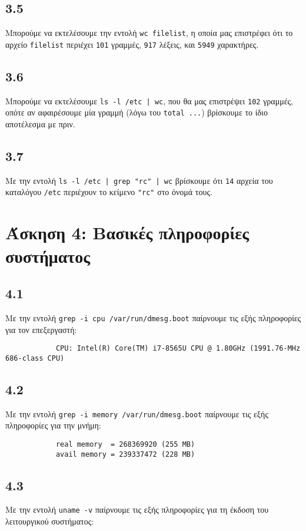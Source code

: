 \documentclass[a4paper, 12pt]{article}
\begin{document}
	\subsection*{3.5}
		Μπορούμε να εκτελέσουμε την εντολή \verb|wc filelist|, η οποία μας επιστρέφει ότι το αρχείο \verb|filelist| περιέχει \verb|101| γραμμές, \verb|917| λέξεις, και \verb|5949| χαρακτήρες.

	\subsection*{3.6}
		Μπορούμε να εκτελέσουμε \verb+ls -l /etc | wc+, που θα μας επιστρέψει \verb|102| γραμμές, οπότε αν αφαιρέσουμε μία γραμμή (λόγω του \verb|total ...|) βρίσκουμε το ίδιο αποτέλεσμα με πριν.
	
	\subsection*{3.7}
		Με την εντολή \verb+ls -l /etc | grep "rc" | wc+ βρίσκουμε ότι \verb|14| αρχεία του καταλόγου \verb|/etc| περιέχουν το κείμενο \verb|"rc"| στο όνομά τους.

\section*{Άσκηση 4: Βασικές πληροφορίες συστήματος}

	\subsection*{4.1}
		Με την εντολή \verb+grep -i cpu /var/run/dmesg.boot+ παίρνουμε τις εξής πληροφορίες για τον επεξεργαστή: 
		
		\begin{verbatim}
			CPU: Intel(R) Core(TM) i7-8565U CPU @ 1.80GHz (1991.76-MHz 686-class CPU)
		\end{verbatim}

	\subsection*{4.2}
		Με την εντολή \verb+grep -i memory /var/run/dmesg.boot+ παίρνουμε τις εξής πληροφορίες για την μνήμη:
		
		\begin{verbatim}
			real memory  = 268369920 (255 MB)
			avail memory = 239337472 (228 MB)
		\end{verbatim}

	\subsection*{4.3}
		Με την εντολή \verb|uname -v| παίρνουμε τις εξής πληροφορίες για τη έκδοση του λειτουργικού συστήματος:
		
\end{document}
